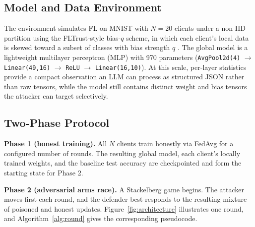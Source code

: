 \documentclass[conference]{IEEEtran}
\begin{document}
\subsection{Model and Data Environment}
The environment simulates FL on MNIST with $N=20$ clients under a non-IID partition using the FLTrust-style bias-$q$ scheme, in which each client's local data is skewed toward a subset of classes with bias strength $q$ \cite{fltrust}. The global model is a lightweight multilayer perceptron (MLP) with 970 parameters (\texttt{AvgPool2d(4)} $\to$ \texttt{Linear(49,16)} $\to$ \texttt{ReLU} $\to$ \texttt{Linear(16,10)}). At this scale, per-layer statistics provide a compact observation an LLM can process as structured JSON rather than raw tensors, while the model still contains distinct weight and bias tensors the attacker can target selectively.

\subsection{Two-Phase Protocol}
\textbf{Phase 1 (honest training).} All $N$ clients train honestly via FedAvg for a configured number of rounds. The resulting global model, each client's locally trained weights, and the baseline test accuracy are checkpointed and form the starting state for Phase 2.

\textbf{Phase 2 (adversarial arms race).} A Stackelberg game begins. The attacker moves first each round, and the defender best-responds to the resulting mixture of poisoned and honest updates. Figure~\ref{fig:architecture} illustrates one round, and Algorithm~\ref{alg:round} gives the corresponding pseudocode.
\end{document}
